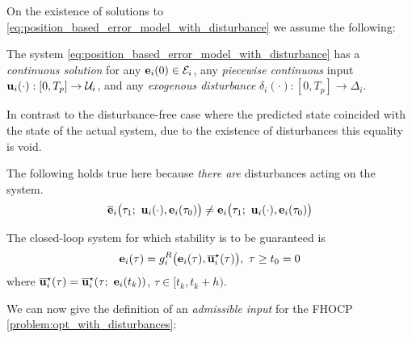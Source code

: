 On the existence of solutions to
\eqref{eq:position_based_error_model_with_disturbance} we assume the following:
\begin{bw_box}
\begin{assumption}
  \label{ass:existence_of_solutions_with_disturbance}

  The system \eqref{eq:position_based_error_model_with_disturbance} has a
  \textit{continuous solution} for any $\bm{\mathbf{e}}_i(0) \in \mathcal{E}_i$,
  any \textit{piecewise continuous} input
  $\bm{\mathbf{u}}_i(\cdot) :[0,T_p] \to \mathcal{U}_i$, and any
  \textit{exogenous disturbance} $\delta_i(\cdot) : [0,T_p] \to \Delta_i$.
\end{assumption}
\end{bw_box}


In contrast to the disturbance-free case where the predicted state coincided
with the state of the actual system, due to the existence of disturbances
this equality is void.

\begin{bw_box}
\begin{remark}
  The following holds true here because \textit{there are} disturbances
  acting on the system.
  \begin{align}
    \overline{\bm{\mathbf{e}}}_i\big(\tau_1;\ \bm{\mathbf{u}}_i(\cdot), \bm{\mathbf{e}}_i(\tau_0)\big) \not=
    \bm{\mathbf{e}}_i\big(\tau_1;\ \bm{\mathbf{u}}_i(\cdot), \bm{\mathbf{e}}_i(\tau_0)\big)
    \label{eq:error_now_to_predicted_error_2}
  \end{align}
\end{remark}
\end{bw_box}

The closed-loop system for which stability is to be guaranteed is
\begin{align}
  \bm{\mathbf{e}}_i(\tau) = g_i^R\big(\bm{\mathbf{e}}_i(\tau), \overline{\bm{\mathbf{u}}}_i^{\star}(\tau)\big),\ \tau \geq t_0 = 0
  \label{eq:with_disturbances_closed_loop}
\end{align}
where $\overline{\bm{\mathbf{u}}}_i^{\star}(\tau) = \overline{\bm{\mathbf{u}}}_i^{\star}(\tau;\ \bm{\mathbf{e}}_i(t_k))$,
$\tau \in [t_k, t_k + h)$.

We can now give the definition of an \textit{admissible input} for the FHOCP
\eqref{problem:opt_with_disturbances}:

